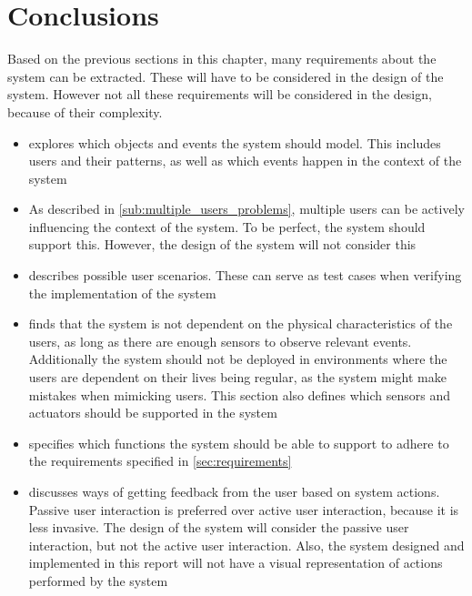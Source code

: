 \section{Conclusions}

Based on the previous sections in this chapter, many requirements about the system can be extracted. These will have to be considered in the design of the system. However not all these requirements will be considered in the design, because of their complexity. 

\begin{itemize}
\item {} explores which objects and events the system should model. This includes users and their patterns, as well as which events happen in the context of the system
\item As described in \cref{sub:multiple_users_problems}, multiple users can be actively influencing the context of the system. To be perfect, the system should support this. However, the design of the system will not consider this
\item {} describes possible user scenarios. These can serve as test cases when verifying the implementation of the system
\item {} finds that the system is not dependent on the physical characteristics of the users, as long as there are enough sensors to observe relevant events. Additionally the system should not be deployed in environments where the users are dependent on their lives being regular, as the system might make mistakes when mimicking users. This section also defines which sensors and actuators should be supported in the system
\item {} specifies which functions the system should be able to support to adhere to the requirements specified in \cref{sec:requirements}
\item {} discusses ways of getting feedback from the user based on system actions. Passive user interaction is preferred over active user interaction, because it is less invasive. The design of the system will consider the passive user interaction, but not the active user interaction. Also, the system designed and implemented in this report will not have a visual representation of actions performed by the system
\end{itemize}
